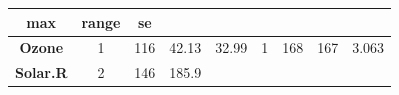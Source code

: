 \documentclass[]{article}
\theoremstyle{definition}
\theoremstyle{definition}
\theoremstyle{definition}
\theoremstyle{remark}
\begin{document}
\begin{longtable}[]{@{}ccccccccc@{}}
\begin{minipage}[b]{0.07\columnwidth}
max\strut
\end{minipage} & \begin{minipage}[b]{0.08\columnwidth}\centering\strut
range\strut
\end{minipage} & \begin{minipage}[b]{0.08\columnwidth}\centering\strut
se\strut
\end{minipage}\tabularnewline
\midrule
\endhead
\begin{minipage}[t]{0.15\columnwidth}\centering\strut
\textbf{Ozone}\strut
\end{minipage} & \begin{minipage}[t]{0.07\columnwidth}\centering\strut
1\strut
\end{minipage} & \begin{minipage}[t]{0.06\columnwidth}\centering\strut
116\strut
\end{minipage} & \begin{minipage}[t]{0.08\columnwidth}\centering\strut
42.13\strut
\end{minipage} & \begin{minipage}[t]{0.08\columnwidth}\centering\strut
32.99\strut
\end{minipage} & \begin{minipage}[t]{0.06\columnwidth}\centering\strut
1\strut
\end{minipage} & \begin{minipage}[t]{0.07\columnwidth}\centering\strut
168\strut
\end{minipage} & \begin{minipage}[t]{0.08\columnwidth}\centering\strut
167\strut
\end{minipage} & \begin{minipage}[t]{0.08\columnwidth}\centering\strut
3.063\strut
\end{minipage}\tabularnewline
\begin{minipage}[t]{0.15\columnwidth}\centering\strut
\textbf{Solar.R}\strut
\end{minipage} & \begin{minipage}[t]{0.07\columnwidth}\centering\strut
2\strut
\end{minipage} & \begin{minipage}[t]{0.06\columnwidth}\centering\strut
146\strut
\end{minipage} & \begin{minipage}[t]{0.08\columnwidth}\centering\strut
185.9\strut
\end{minipage} & \begin{minipage}[t]{0.08\columnwidth}\centering\strut

\end{minipage}
\end{longtable}
\end{document}
